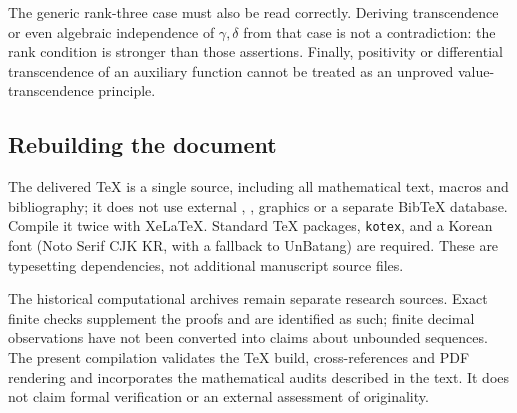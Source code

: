 \documentclass[11pt,a4paper]{article}
\theoremstyle{definition}
\theoremstyle{remark}
\theoremstyle{plain}
\numberwithin{equation}{section}
\begin{document}
The generic rank-three case must also be read correctly. Deriving
transcendence or even algebraic independence of $\gamma,\delta$ from
that case is not a contradiction: the rank condition is stronger than
those assertions. Finally, positivity or differential transcendence
of an auxiliary function cannot be treated as an unproved
value-transcendence principle.

\subsection{Rebuilding the document}
The delivered TeX is a single source, including all mathematical text,
macros and bibliography; it does not use external \verb||,
\verb||, graphics or a separate BibTeX database. Compile it twice
with XeLaTeX. Standard TeX packages, \texttt{kotex}, and a Korean font
(Noto Serif CJK KR, with a fallback to UnBatang) are required. These
are typesetting dependencies, not additional manuscript source files.

The historical computational archives remain separate research sources.
Exact finite checks supplement the proofs and are identified as such;
finite decimal observations have not been converted into claims about
unbounded sequences. The present compilation validates the TeX build,
cross-references and PDF rendering and incorporates the mathematical
audits described in the text. It does not claim formal verification or
an external assessment of originality.

\end{document}
